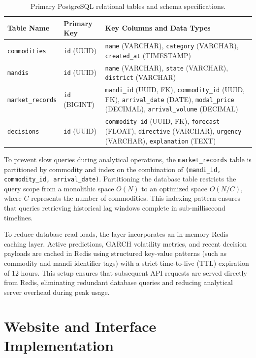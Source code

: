 \documentclass[12pt,a4paper]{report}
\theoremstyle{definition}
\theoremstyle{remark}
\begin{document}
\begin{table}[htbp]
\centering
\caption{Primary PostgreSQL relational tables and schema specifications.}
\label{tab:postgres_schema}
\begin{tabular}{p{3.5cm}|p{3.0cm}|p{8.0cm}}
\hline
\textbf{Table Name} & \textbf{Primary Key} & \textbf{Key Columns and Data Types} \\
\hline
\texttt{commodities} & \texttt{id} (UUID) & \texttt{name} (VARCHAR), \texttt{category} (VARCHAR), \texttt{created\_at} (TIMESTAMP) \\
\hline
\texttt{mandis} & \texttt{id} (UUID) & \texttt{name} (VARCHAR), \texttt{state} (VARCHAR), \texttt{district} (VARCHAR) \\
\hline
\texttt{market\_records} & \texttt{id} (BIGINT) & \texttt{mandi\_id} (UUID, FK), \texttt{commodity\_id} (UUID, FK), \texttt{arrival\_date} (DATE), \texttt{modal\_price} (DECIMAL), \texttt{arrival\_volume} (DECIMAL) \\
\hline
\texttt{decisions} & \texttt{id} (UUID) & \texttt{commodity\_id} (UUID, FK), \texttt{forecast} (FLOAT), \texttt{directive} (VARCHAR), \texttt{urgency} (VARCHAR), \texttt{explanation} (TEXT) \\
\hline
\end{tabular}
\end{table}

To prevent slow queries during analytical operations, the \texttt{market\_records} table is partitioned by commodity and index on the combination of \texttt{(mandi\_id, commodity\_id, arrival\_date)}. Partitioning the database table restricts the query scope from a monolithic space $O(N)$ to an optimized space $O(N/C)$, where $C$ represents the number of commodities. This indexing pattern ensures that queries retrieving historical lag windows complete in sub-millisecond timelines.

To reduce database read loads, the layer incorporates an in-memory Redis caching layer. Active predictions, GARCH volatility metrics, and recent decision payloads are cached in Redis using structured key-value patterns (such as commodity and mandi identifier tags) with a strict time-to-live (TTL) expiration of 12 hours. This setup ensures that subsequent API requests are served directly from Redis, eliminating redundant database queries and reducing analytical server overhead during peak usage.

\section{Website and Interface Implementation}
\end{document}

